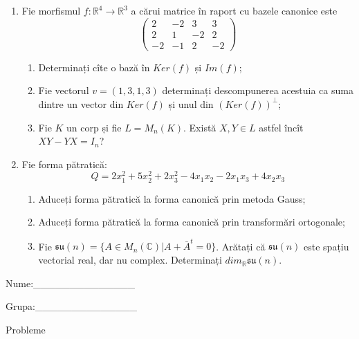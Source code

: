 \documentclass{article}
\begin{document}
\begin{enumerate}
 \item Fie morfismul $f:\mathbb{R}^4 \to \mathbb{R}^3$ a cărui matrice în raport cu bazele canonice este
$$\begin{pmatrix}
2&-2&3&3\\
2&1&-2&2\\
-2&-1&2&-2
\end{pmatrix}$$

\begin{enumerate}
\item Determinați cîte o bază în $Ker(f)$ și $Im(f)$;
\item Fie vectorul $v=(1,3,1,3)$ determinați descompunerea acestuia ca suma dintre un vector din $Ker(f)$ și unul din $(Ker(f))^\perp$;
\item Fie $K$ un corp și fie $L=M_n(K)$. Există $X,Y \in L$ astfel încît $XY-YX=I_n$?  
\end{enumerate}
\item Fie forma pătratică:
$$Q= 2x_1^2+5x_2^2+2x_3^2-4x_1x_2-2x_1x_3+4x_2x_3$$

\begin{enumerate}
\item Aduceți forma pătratică la forma canonică prin metoda Gauss;
\item Aduceți forma pătratică la forma canonică prin transformări ortogonale;
\item Fie $\mathfrak{su}(n)=\{ A \in M_n(\mathbb{C}) | A+\bar{A}^t=0\}$. Arătați că $\mathfrak{su}(n)$ este spațiu vectorial real, dar nu complex.
Determinați $dim_{\mathbb{R}}\mathfrak{su}(n)$.
\end{enumerate}
\end{enumerate}
\newpage
\begin{flushright}
Nume:\_\_\_\_\_\_\_\_\_\_\_\_\_\_
 
 
Grupa:\_\_\_\_\_\_\_\_\_\_\_\_\_\_
\end{flushright}
\begin{center}
\vspace{2cm}
{\Large Probleme}
\vspace{2cm}
\end{center}
\end{document}
